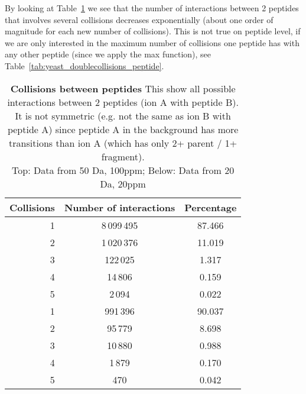 By looking at Table~\ref{tab:yeast_doublecollisions} 
we see that the number of interactions
between 2 peptides that involves several collisions decreases exponentially
(about one order of magnitude for each new number of collisions). This is not
true on peptide level, if we are only interested in the maximum number of
collisions one peptide has with any other peptide (since we apply the max
function), see Table~\ref{tab:yeast_doublecollisions_peptide}.

\begin{table}[h]

\centering
\caption[Collisions between peptides]
{\textbf{Collisions between peptides} This show all possible interactions
between 2 peptides (ion A with peptide B). It is not symmetric (e.g. not the
same as ion B with peptide A) since peptide A in the background has more
transitions than ion A (which has only 2+ parent / 1+ fragment).\\
Top: Data from 50 Da, 100ppm; Below: Data from 20 Da, 20ppm
}
\label{tab:yeast_doublecollisions}

\begin{tabular}{ r c c }
\maketablespace
Collisions & Number of interactions & Percentage \\
\toprule

1 & 8\,099\,495 & 87.466 \\
2 & 1\,020\,376 & 11.019 \\
3 & \phantom{1\,}122\,025 & \phantom{1}1.317 \\
4 & \phantom{1\,1}14\,806 & \phantom{1}0.159 \\
5 & \phantom{1\,11}2\,094 & \phantom{1}0.022 \\

\midrule

1 & \phantom{1\,}991\,396 & 90.037 \\
2 & \phantom{1\,1}95\,779 & \phantom{1}8.698 \\
3 & \phantom{1\,1}10\,880 & \phantom{1}0.988 \\
4 & \phantom{1\,11}1\,879 & \phantom{1}0.170 \\
5 & \phantom{1\,111\,}470 & \phantom{1}0.042 \\


\end{tabular}
\end{table}

